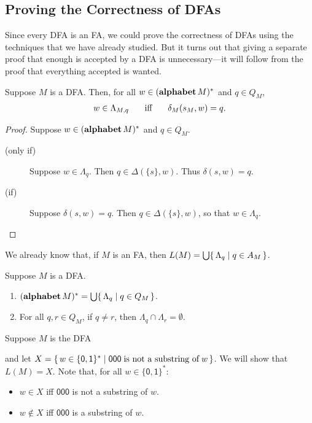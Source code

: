 \subsection{Proving the Correctness of DFAs}

Since every DFA is an FA, we could prove the correctness of DFAs
using the techniques that we have already studied.
But it turns out that giving a separate proof that enough is accepted
by a DFA is unnecessary---it will follow from the proof that
everything accepted is wanted.

\begin{proposition}
Suppose $M$ is a DFA.  Then, for all $w\in(\mathbf{alphabet}\,M)^*$ and $q\in Q_M$,
\begin{gather*}
w\in\Lambda_{M,q} \quad\mathrel{\;\;\allowbreak\mbox{iff}\allowbreak\;\;}\quad \delta_M(s_M,w) = q .
\end{gather*}
\end{proposition}

\begin{proof}
Suppose $w\in(\mathbf{alphabet}\,M)^*$ and $q\in Q_M$.
\begin{description}
\item[\quad(only if)] Suppose $w\in\Lambda_q$.  Then
  $q\in\Delta(\{s\},w)$.  Thus $\delta(s,w) = q$.

\item[\quad(if)] Suppose $\delta(s,w) = q$.  Then
  $q\in\Delta(\{s\},w)$, so that $w\in\Lambda_q$.
\end{description}
\end{proof}

We already know that, if $M$ is an FA, then
$L(M)=\bigcup\{ \, \Lambda_q \mid q\in A_M \, \}$.

\begin{proposition}
Suppose $M$ is a DFA.
\begin{enumerate}[\quad(1)]
\item $(\mathbf{alphabet}\,M)^* = \bigcup\{ \, \Lambda_q \mid q\in Q_M \, \}$.

\item For all $q,r\in Q_M$, if $q\neq r$, then
  $\Lambda_q\cap\Lambda_r=\emptyset$.
\end{enumerate}
\end{proposition}

Suppose $M$ is the DFA
\begin{center}

\end{center}
and let $X=\{ \, w\in\{\mathsf{0,1}\}^* \mid \mathsf{000}\;\allowbreak\mbox{is not a
    substring of}\allowbreak\;w \, \}$.  We will show that $L(M)=X$.  Note that, for all
$w\in\{\mathsf{0,1}\}^*$:
\begin{itemize}
\item $w\in X$ iff $\mathsf{000}$ is not a substring of $w$.

\item $w\not\in X$ iff $\mathsf{000}$ is a substring of $w$.
\end{itemize}

